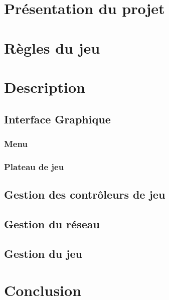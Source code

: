 \documentclass{report}
\begin{document}
\section*{Présentation du projet}


\section{Règles du jeu}


\section{Description}

	\subsection{Interface Graphique}
	
		\subsubsection{Menu}
		\subsubsection{Plateau de jeu}
	\subsection{Gestion des contrôleurs de jeu}
	
	\subsection{Gestion du réseau}
	
	\subsection{Gestion du jeu}
	

\section*{Conclusion}

\end{document}
